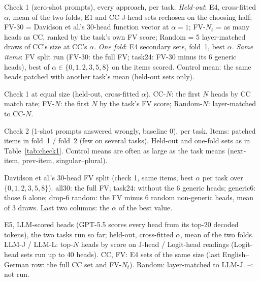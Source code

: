 \documentclass[10pt,a4paper]{article}
\begin{document}
\begin{table}[!htbp]
\centering\small\setlength{\tabcolsep}{4pt}

\caption{Check 1 (zero-shot prompts), every approach, per task. \emph{Held-out}: E4, cross-fitted $\alpha$, mean of the two folds; E1 and CC J-head sets rechosen on the choosing half; FV-30 = Davidson et al.'s 30-head function vector at $\alpha=1$; FV-$N_t$ = as many heads as CC, ranked by the task's own FV score; Random = 5 layer-matched draws of CC's size at CC's $\alpha$. \emph{One fold}: E4 secondary sets, fold~1, best $\alpha$. \emph{Same items}: FV split run (FV-30: the full FV; task24: FV-30 minus its 6 generic heads), best of $\alpha\in\{0,1,2,3,5,8\}$ on the items scored. Control mean: the same heads patched with another task's mean (held-out sets only).}
\label{tab:check1}
\end{table}

\begin{table}[!htbp]
\centering\small

\caption{Check 1 at equal size (held-out, cross-fitted $\alpha$). CC-$N$: the first $N$ heads by CC match rate; FV-$N$: the first $N$ by the task's FV score; Random-$N$: layer-matched to CC-$N$.}
\label{tab:sizes}
\end{table}

\begin{table}[!htbp]
\centering\small\setlength{\tabcolsep}{4pt}

\caption{Check 2 (1-shot prompts answered wrongly, baseline 0), per task. Items: patched items in fold~1 / fold~2 (few on several tasks). Held-out and one-fold sets as in Table~\ref{tab:check1}. Control means are often as large as the task means (next-item, prev-item, singular--plural).}
\label{tab:check2}
\end{table}

\begin{table}[!htbp]
\centering\small

\caption{Davidson et al.'s 30-head FV split (check 1, same items, best $\alpha$ per task over $\{0,1,2,3,5,8\}$). all30: the full FV; task24: without the 6 generic heads; generic6: those 6 alone; drop-6 random: the FV minus 6 random non-generic heads, mean of 3 draws. Last two columns: the $\alpha$ of the best value.}
\label{tab:fvsplit}
\end{table}

\begin{table}[!htbp]
\centering\small

\caption{E5, LLM-scored heads (GPT-5.5 scores every head from its top-20 decoded tokens), the two tasks run so far; held-out, cross-fitted $\alpha$, mean of the two folds. LLM-J / LLM-L: top-$N$ heads by score on J-head / Logit-head readings (Logit-head sets run up to 40 heads). CC, FV: E4 sets of the same size (last English--German row: the full CC set and FV-$N_t$). Random: layer-matched to LLM-J. --: not run.}
\label{tab:llm}
\end{table}
\end{document}
